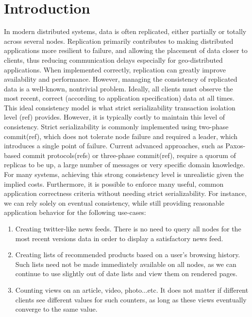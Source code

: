 

\section{Introduction}

In modern distributed systems, data is often replicated, either partially or totally 
across several nodes. Replication primarily contributes to making distributed 
applications more resilient to failure, and allowing the placement of data closer to clients, 
thus reducing communication delays especially for geo-distributed applications. 
When implemented correctly, replication can greatly improve availability and performance.
However, managing the consistency of replicated data is a well-known, nontrivial
problem. Ideally, all clients must observe the most recent, correct (according to
application specification) data at all times. This ideal consistency model is what
strict serializability transaction isolation level (ref) provides. However, it
is typically costly to maintain this level of consistency.  Strict
serializability is commonly implemented using two-phase commit(ref), which does not
tolerate node failure and required a leader, which introduces a single point of
failure. Current advanced approaches, such as Paxos-based commit protocols(refs) or three-phase commit(ref),
require a quorum of replicas to be up, a large number of messages or very
specific domain knowledge. \\  %

For many systems, achieving this strong consistency level is unrealistic given
the implied costs. Furthermore, it is possible to enforce many useful, common
application correctness criteria without needing strict serializability. 
For instance, we can rely solely on eventual consistency, while still providing
reasonable application behavior for the following use-cases:

\begin{enumerate}
\item Creating twitter-like news feeds. There is no need to query all nodes for
the most recent versions data in order to display a satisfactory news feed.

\item Creating lists of recommended products based on a user's browsing history.
Such lists need not be made immediately available on all nodes, as we can
continue to use slightly out of date lists and view them on rendered pages.

\item Counting views on an article, video, photo...etc. It does not matter if
different clients see different values for such counters, as long as these
views eventually converge to the same value.
\end{enumerate}

